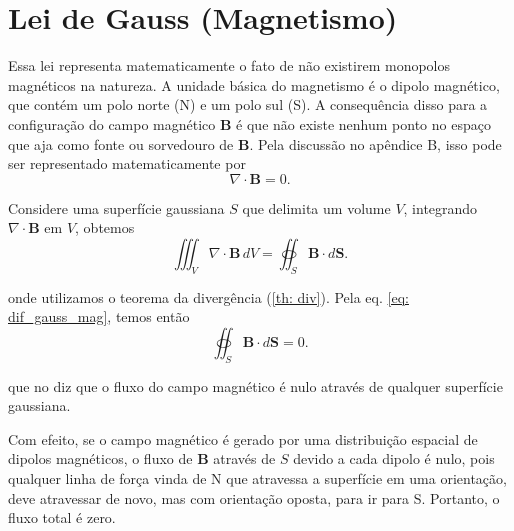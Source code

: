\section{Lei de Gauss (Magnetismo)}

Essa lei representa matematicamente o fato de não existirem monopolos magnéticos na natureza. A unidade básica do magnetismo é o dipolo magnético, que contém um polo norte (N) e um polo sul (S). A consequência disso para a configuração do campo magnético $\mathbf{B}$ é que não existe nenhum ponto no espaço que aja como fonte ou sorvedouro de $\mathbf{B}$. Pela discussão no apêndice B, isso pode ser representado matematicamente por
\begin{equation}
\nabla \cdot \mathbf{B} = 0.
\label{eq: dif_gauss_mag}
\end{equation}

Considere uma superfície gaussiana $S$ que delimita um volume $V$, integrando $\nabla \cdot \mathbf{B}$ em $V$, obtemos
\begin{equation}
\iiint_V \nabla \cdot \mathbf{B} \, dV = \oiint_S \mathbf{B} \cdot d\mathbf{S}.
\end{equation}

\noindent onde utilizamos o teorema da divergência (\ref{th: div}). Pela eq. \eqref{eq: dif_gauss_mag}, temos então 
\begin{equation}
\oiint_S \mathbf B \cdot d\mathbf{S} = 0.
\label{eq: int_gauss_mag}
\end{equation}

\noindent que no diz que o fluxo do campo magnético é nulo através de qualquer superfície gaussiana. 

Com efeito, se o campo magnético é gerado por uma distribuição espacial de dipolos magnéticos, o fluxo de $\mathbf{B}$ através de $S$ devido a cada dipolo é nulo, pois qualquer linha de força vinda de N que atravessa a superfície em uma orientação, deve atravessar de novo, mas com orientação oposta, para ir para S. Portanto, o fluxo total é zero. 
